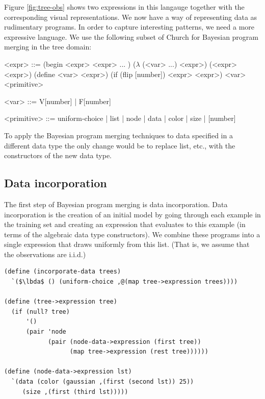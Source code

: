 \documentclass[a4paper,10pt]{article}
\newcommand{\lbda}{\color[rgb]{0,.3,.7} \lambda}
\begin{document}
Figure \ref{fig:tree-obs} shows two expressions in this langauge together with the corresponding visual representations.
We now have a way of representing data as rudimentary programs.  In order to capture interesting patterns, we need a more expressive language.  We use the following subset of Church for Bayesian program merging in the tree domain:
\begin{grammar}
<expr> ::= (begin <expr> <expr> ... ) 
\alt ($\lambda$ (<var> ...) <expr>)
\alt (<expr> <expr>)  
\alt (define <var> <expr>)
\alt (if (flip [number]) <expr> <expr>)
\alt <var> 
\alt <primitive>

<var> ::= V[number] | F[number] 

<primitive> ::= uniform-choice | list | node | data | color | size | [number]
\end{grammar}
To apply the Bayesian program merging techniques to data specified in a different data type the only change would be to replace list, etc., with the constructors of the new data type.

\subsection{Data incorporation}
The first step of Bayesian program merging is data incorporation.  Data incorporation is the creation of an initial model by going through each example in the training set and creating an expression that evaluates to this example (in terms of the algebraic data type constructors).  We combine these programs into a single expression that draws uniformly from this list. (That is, we assume that the observations are i.i.d.) 
\begin{lstlisting}[frame=trblsingle]
(define (incorporate-data trees)
  `($\lbda$ () (uniform-choice ,@(map tree->expression trees))))

(define (tree->expression tree)
  (if (null? tree)
      '()
      (pair 'node
            (pair (node-data->expression (first tree)) 
                  (map tree->expression (rest tree))))))

(define (node-data->expression lst)
  `(data (color (gaussian ,(first (second lst)) 25)) 
	 (size ,(first (third lst)))))
\end{lstlisting}
\end{document}
